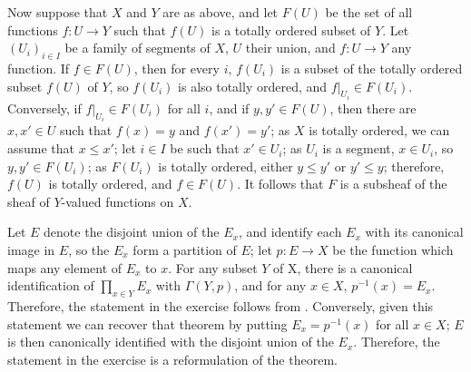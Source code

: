 \documentclass{article}
\begin{document}
\begin{solution}[\ref{exe:rpm18mof}]
  Now suppose that \(X\) and \(Y\) are as above, and let \(F(U)\) be
  the set of all functions \(f : U \to Y\) such that \(f(U)\) is a
  totally ordered subset of \(Y\).  Let \((U_i)_{i \in I}\) be a
  family of segments of \(X\), \(U\) their union, and \(f : U \to Y\)
  any function.  If \(f \in F(U)\), then for every \(i\), \(f(U_i)\)
  is a subset of the totally ordered subset \(f(U)\) of \(Y\), so
  \(f(U_i)\) is also totally ordered, and
  \(f \vert_{U_i} \in F(U_i)\).  Conversely, if
  \(f \vert_{U_i} \in F(U_i)\) for all \(i\), and if
  \(y, y' \in F(U)\), then there are \(x,x' \in U\) such that
  \(f(x) = y\) and \(f(x') = y'\); as \(X\) is totally ordered, we can
  assume that \(x \leq x'\); let \(i \in I\) be such that
  \(x' \in U_i\); as \(U_i\) is a segment, \(x \in U_i\), so
  \(y, y' \in F(U_i)\); as \(F(U_i)\) is totally ordered, either
  \(y \leq y'\) or \(y' \leq y\); therefore, \(f(U)\) is totally
  ordered, and \(f \in F(U)\).  It follows that \(F\) is a subsheaf of
  the sheaf of \(Y\)-valued functions on \(X\).
\end{solution}

\begin{solution}[\ref{exe:oh59gz4i}]
  \label{sol:h64ep1j0}
  Let \(E\) denote the disjoint union of the \(E_x\), and identify
  each \(E_x\) with its canonical image in \(E\), so the \(E_x\) form
  a partition of \(E\); let \(p : E \to X\) be the function which maps
  any element of \(E_x\) to \(x\).  For any subset \(Y\) of X, there
  is a canonical identification of \(\prod_{x \in Y} E_x\) with
  \(\Gamma(Y,p)\), and for any \(x \in X\), \(p^{-1}(x) = E_x\).
  Therefore, the statement in the exercise follows from
  .  Conversely, given this statement we can
  recover that theorem by putting \(E_x = p^{-1}(x)\) for all
  \(x \in X\); \(E\) is then canonically identified with the disjoint
  union of the \(E_x\).  Therefore, the statement in the exercise is a
  reformulation of the theorem.
\end{solution}
\end{document}

